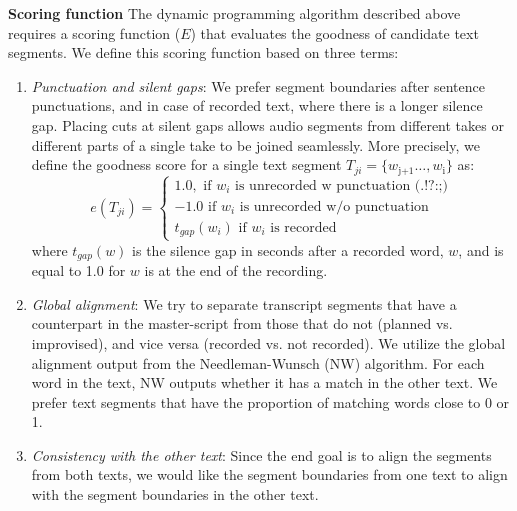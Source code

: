 \textbf{Scoring function}
The dynamic programming algorithm described above requires a
scoring function ($E$) that evaluates the goodness of candidate text segments. We define this scoring function
based on three terms: 
\begin{enumerate}
\item{\textit{Punctuation and silent gaps}: We prefer segment boundaries after sentence punctuations, and in case of recorded text, where there is a longer silence gap. Placing cuts at silent gaps allows audio segments from different takes or different parts of a single take to be joined seamlessly. More precisely, we define the goodness score for a single text segment $T_{ji} = \{w_\text{j+1}
\dots,w_\text{i}\}$ as: \\
\[
    e(T_{ji})= 
\begin{cases}
   1.0, \text{ if } w_i \text{ is unrecorded w punctuation (.!?:;)}\\
   -1.0 \text{ if } w_i \text{ is unrecorded w/o punctuation}\\
   t_{gap}(w_{i}) \text{ if } w_i \text{ is recorded} 
\end{cases}
\]
where $t_{gap}(w)$ is the silence gap in seconds after a recorded word, $w$, and is equal to 1.0 for $w$ is at the end of the recording. }

\item{\textit{Global alignment}: We try to separate transcript segments that have a counterpart in the master-script from those that do not (planned vs. improvised), and vice versa (recorded vs. not recorded). We utilize the global alignment output from the Needleman-Wunsch (NW) algorithm. For each word in the text, NW outputs whether it has a match in the other text. We prefer text segments that have the proportion of matching words close to 0 or 1.  }
\item{\textit{Consistency with the other text}: Since the end goal is to align the segments from both texts, we would like the segment boundaries from one text to align with the segment boundaries in the other text. } 
\end{enumerate}




